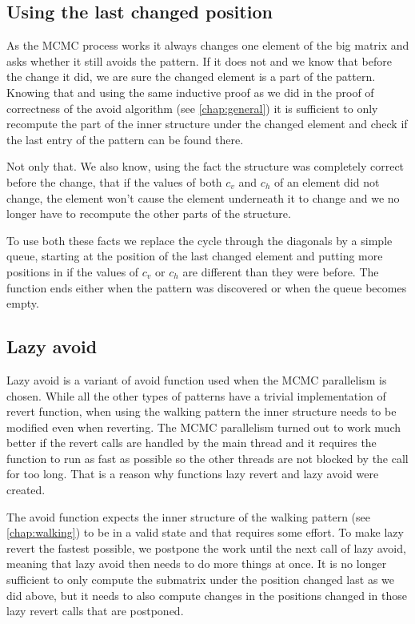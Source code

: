 \subsection{Using the last changed position}
As the MCMC process works it always changes one element of the big matrix and asks whether it still avoids the pattern. If it does not and we know that before the change it did, we are sure the changed element is a part of the pattern. Knowing that and using the same inductive proof as we did in the proof of correctness of the avoid algorithm (see \autoref{chap:general}) it is sufficient to only recompute the part of the inner structure under the changed element and check if the last entry of the pattern can be found there.

Not only that. We also know, using the fact the structure was completely correct before the change, that if the values of both $c_v$ and $c_h$ of an element did not change, the element won't cause the element underneath it to change and we no longer have to recompute the other parts of the structure.

To use both these facts we replace the cycle through the diagonals by a simple queue, starting at the position of the last changed element and putting more positions in if the values of $c_v$ or $c_h$ are different than they were before. The function ends either when the pattern was discovered or when the queue becomes empty.

\subsection{Lazy avoid}
Lazy avoid is a variant of avoid function used when the MCMC parallelism is chosen. While all the other types of patterns have a trivial implementation of revert function, when using the walking pattern the inner structure needs to be modified even when reverting. The MCMC parallelism turned out to work much better if the revert calls are handled by the main thread and it requires the function to run as fast as possible so the other threads are not blocked by the call for too long. That is a reason why functions lazy revert and lazy avoid were created.

The avoid function expects the inner structure of the walking pattern (see \autoref{chap:walking}) to be in a valid state and that requires some effort. To make lazy revert the fastest possible, we postpone the work until the next call of lazy avoid, meaning that lazy avoid then needs to do more things at once. It is no longer sufficient to only compute the submatrix under the position changed last as we did above, but it needs to also compute changes in the positions changed in those lazy revert calls that are postponed.

